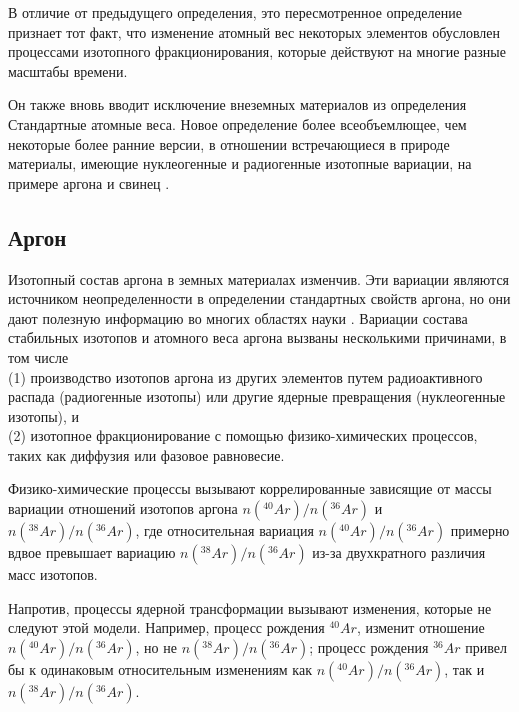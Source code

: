 \documentclass[a5paper,openany]{book}
\begin{document}
В отличие от предыдущего определения, это пересмотренное определение признает тот факт, что изменение
атомный вес некоторых элементов обусловлен процессами изотопного фракционирования, которые действуют на многие разные масштабы времени.

Он также вновь вводит исключение внеземных материалов из определения Стандартные атомные веса. Новое определение более всеобъемлющее, чем некоторые более ранние версии, в отношении
встречающиеся в природе материалы, имеющие нуклеогенные и радиогенные изотопные вариации, на примере аргона
\cite{IUPACArgon} и свинец \cite{IUPACLead}.

\subsection{Аргон} \label{s:Argon}

Изотопный состав аргона в земных материалах изменчив. Эти вариации являются источником неопределенности в определении стандартных свойств аргона, но они дают полезную информацию во многих областях науки \cite{IUPACArgon}. Вариации состава стабильных изотопов и атомного веса аргона вызваны несколькими причинами, в том числе \\
(1) производство изотопов аргона из других элементов путем радиоактивного распада (радиогенные
изотопы) или другие ядерные превращения (нуклеогенные изотопы), и     \\
(2) изотопное фракционирование с помощью физико-химических процессов, таких как диффузия или фазовое равновесие.  

Физико-химические процессы вызывают
коррелированные зависящие от массы вариации отношений изотопов аргона $n(^{40}Ar)/n(^{36}Ar)$ и $n(^{38}Ar)/n(^{36}Ar)$,
где относительная вариация $n(^{40}Ar)/n(^{36}Ar)$ примерно вдвое превышает вариацию $n(^{38}Ar)/n(^{36}Ar)$ из-за
двухкратного различия масс изотопов. 

Напротив, процессы ядерной трансформации вызывают изменения, которые не следуют этой модели. Например, процесс рождения $^{40}Ar$, изменит отношение $n(^{40}Ar)/n(^{36}Ar)$, но не $n(^{38}Ar)/n(^{36}Ar)$; процесс рождения $^{36}Ar$ привел бы к одинаковым относительным изменениям как $n(^{40}Ar)/n(^{36}Ar)$, так и $n(^{38}Ar)/n(^{36}Ar)$.
\end{document}
